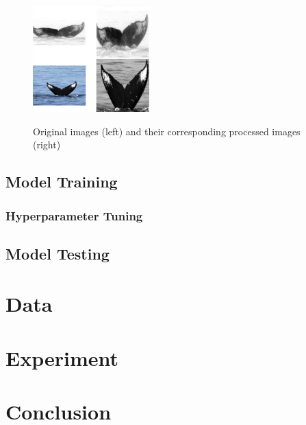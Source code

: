 \documentclass[paper=a4, fontsize=11pt]{scrartcl}
\numberwithin{equation}{section}		%
\numberwithin{table}{section}				%
\begin{document}
\begin{figure}[h]
    \caption{Original images (left) and their corresponding processed images (right)}
    \centering
    \includegraphics[width=0.4\textwidth]{ProcessedImages.png}
    \label{fig:fig2}
\end{figure}


\subsection{Model Training}

\subsubsection{Hyperparameter Tuning}

\subsection{Model Testing}

\section{Data}\label{sec: data}

\section{Experiment}\label{sec: experiment}

\section{Conclusion}\label{sec: conlusion}

 
\clearpage
 




\end{document}
